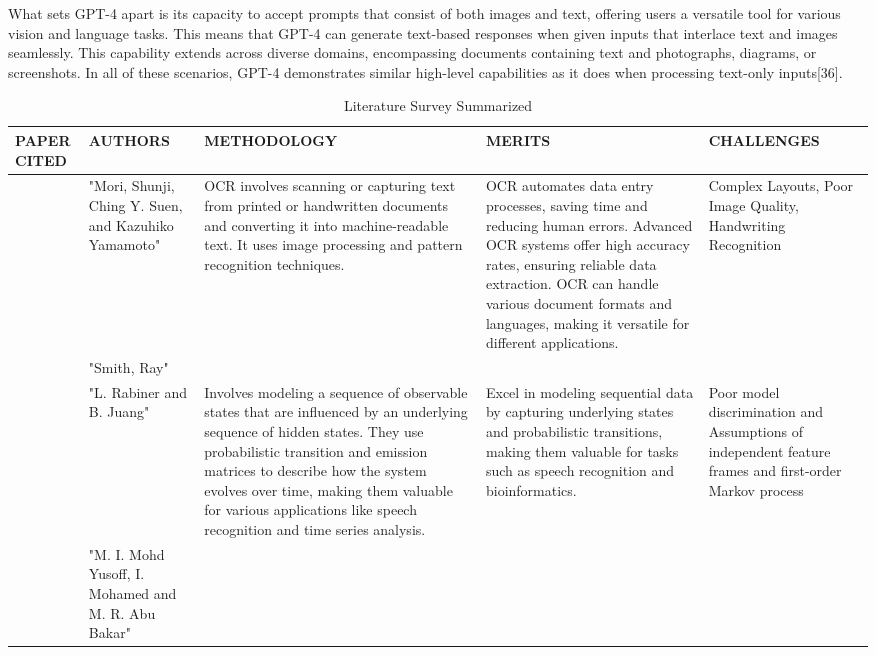 \documentclass[conference]{IEEEtran}
\begin{document}
What sets GPT-4 apart is its capacity to accept prompts that consist of both images and text, offering users a versatile tool for various vision and language tasks. This means that GPT-4 can generate text-based responses when given inputs that interlace text and images seamlessly. This capability extends across diverse domains, encompassing documents containing text and photographs, diagrams, or screenshots. In all of these scenarios, GPT-4 demonstrates similar high-level capabilities as it does when processing text-only inputs[36].





\baselineskip
\begin{table}
 \caption{Literature Survey Summarized}
\begin{center}
 \centering
    \begin{tabular}{ |p{1cm}|p{2cm}|p{4cm}|p{4cm}|p{4cm}| }
\hline
\centering PAPER CITED & \centering  AUTHORS & \centering METHODOLOGY &  \centering MERITS &  \centering CHALLENGES \arraybackslash \\ 
\hline
[5]  &  "Mori, Shunji, Ching Y. Suen, and Kazuhiko Yamamoto" &  OCR involves scanning or capturing text from printed or handwritten documents and converting it into machine-readable text. It uses image processing and pattern recognition techniques. &  OCR automates data entry processes, saving time and reducing human errors. Advanced OCR systems offer high accuracy rates, ensuring reliable data extraction. OCR can handle various document formats and languages, making it versatile for different applications. &  Complex Layouts, Poor Image Quality, Handwriting Recognition  \\
\hline
[6]   &  "Smith, Ray" &  &  &    \\
\hline
[7]  &  "L. Rabiner and B. Juang" &  Involves modeling a sequence of observable states that are influenced by an underlying sequence of hidden states. They use probabilistic transition and emission matrices to describe how the system evolves over time, making them valuable for various applications like speech recognition and time series analysis. & Excel in modeling sequential data by capturing underlying states and probabilistic transitions, making them valuable for tasks such as speech recognition and bioinformatics. &  Poor model discrimination and Assumptions of independent feature frames and first-order Markov process  \\
\hline
[8]  &  "M. I. Mohd Yusoff, I. Mohamed and M. R. Abu Bakar" & & &   \\

\end{tabular}
\end{center}
\end{table}
\end{document}
